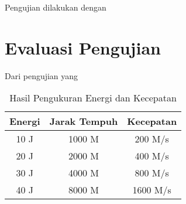 Pengujian dilakukan dengan \lipsum[1-2]

\section{Evaluasi Pengujian}
\label{sec:analisispengujian}

Dari pengujian yang \lipsum[1]

\begin{longtable}{|c|c|c|}
  \caption{Hasil Pengukuran Energi dan Kecepatan}
  \label{tb:EnergiKecepatan}\\
  \hline
  \rowcolor[HTML]{C0C0C0}
  \textbf{Energi} & \textbf{Jarak Tempuh} & \textbf{Kecepatan} \\
  \hline
  10 J & 1000 M & 200 M/s \\
  20 J & 2000 M & 400 M/s \\
  30 J & 4000 M & 800 M/s \\
  40 J & 8000 M & 1600 M/s \\
  \hline
\end{longtable}

\lipsum[2-4]
